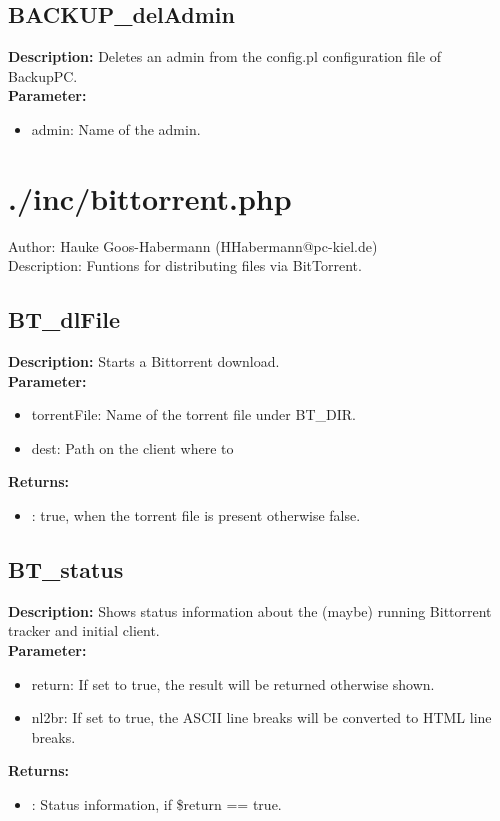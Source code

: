 \subsection{BACKUP\_delAdmin}
\textbf{Description:} Deletes an admin from the config.pl configuration file of BackupPC.\\
\textbf{Parameter:}
\begin{itemize}
\item admin: Name of the admin.
\end{itemize}

\newpage\section{./inc/bittorrent.php}
 Author: Hauke Goos-Habermann (HHabermann@pc-kiel.de)\\
 Description: Funtions for distributing files via BitTorrent.\\

\subsection{BT\_dlFile}
\textbf{Description:} Starts a Bittorrent download.\\
\textbf{Parameter:}
\begin{itemize}
\item torrentFile: Name of the torrent file under BT\_DIR.
\item dest: Path on the client where to 
\end{itemize}
\textbf{Returns:}
\begin{itemize}
\item : true, when the torrent file is present otherwise false.
\end{itemize}

\subsection{BT\_status}
\textbf{Description:} Shows status information about the (maybe) running Bittorrent tracker and initial client.\\
\textbf{Parameter:}
\begin{itemize}
\item return: If set to true, the result will be returned otherwise shown.
\item nl2br: If set to true, the ASCII line breaks will be converted to HTML line breaks.
\end{itemize}
\textbf{Returns:}
\begin{itemize}
\item : Status information, if \$return == true.
\end{itemize}

